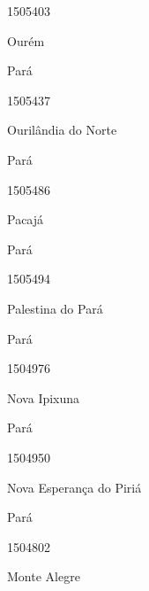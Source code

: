 \documentclass[
  letterpaper,
]{report}
\begin{document}
\n      

1505403

\n      

Ourém

\n    

\n    

\n      

Pará

\n      

1505437

\n      

Ourilândia do Norte

\n    

\n    

\n      

Pará

\n      

1505486

\n      

Pacajá

\n    

\n    

\n      

Pará

\n      

1505494

\n      

Palestina do Pará

\n    

\n    

\n      

Pará

\n      

1504976

\n      

Nova Ipixuna

\n    

\n    

\n      

Pará

\n      

1504950

\n      

Nova Esperança do Piriá

\n    

\n    

\n      

Pará

\n      

1504802

\n      

Monte Alegre

\n    
\end{document}
